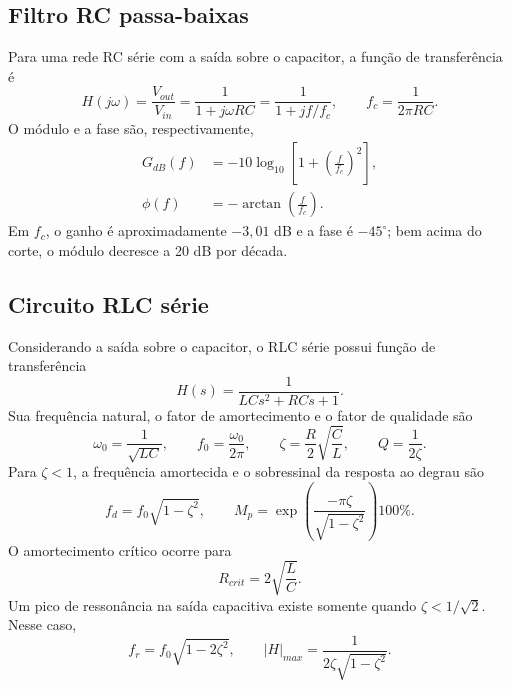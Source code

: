 \documentclass[10pt,journal,onecolumn,a4paper]{IEEEtran}
\begin{document}
\subsection{Filtro RC passa-baixas}

Para uma rede RC série com a saída sobre o capacitor, a função de transferência é
\begin{equation}
  H(j\omega)=\frac{V_{out}}{V_{in}}
             =\frac{1}{1+j\omega RC}
             =\frac{1}{1+jf/f_c},
  \qquad
  f_c=\frac{1}{2\pi RC}.
  \label{eq:rc}
\end{equation}
O módulo e a fase são, respectivamente,
\begin{align}
  G_{dB}(f)&=-10\log_{10}\!\left[1+\left(\frac{f}{f_c}\right)^2\right],
  \label{eq:rc-ganho}\\
  \phi(f)&=-\arctan\!\left(\frac{f}{f_c}\right).
  \label{eq:rc-fase}
\end{align}
Em $f_c$, o ganho é aproximadamente $-3{,}01$ dB e a fase é $-45^\circ$; bem acima do corte,
o módulo decresce a 20 dB por década.

\subsection{Circuito RLC série}

Considerando a saída sobre o capacitor, o RLC série possui função de transferência
\begin{equation}
  H(s)=\frac{1}{LCs^2+RCs+1}.
  \label{eq:rlc-h}
\end{equation}
Sua frequência natural, o fator de amortecimento e o fator de qualidade são
\begin{equation}
  \omega_0=\frac{1}{\sqrt{LC}},
  \qquad
  f_0=\frac{\omega_0}{2\pi},
  \qquad
  \zeta=\frac{R}{2}\sqrt{\frac{C}{L}},
  \qquad
  Q=\frac{1}{2\zeta}.
  \label{eq:rlc-param}
\end{equation}
Para $\zeta<1$, a frequência amortecida e o sobressinal da resposta ao degrau são
\begin{equation}
  f_d=f_0\sqrt{1-\zeta^2},
  \qquad
  M_p=\exp\!\left(\frac{-\pi\zeta}{\sqrt{1-\zeta^2}}\right)100\%.
  \label{eq:rlc-step}
\end{equation}
O amortecimento crítico ocorre para
\begin{equation}
  R_{crit}=2\sqrt{\frac{L}{C}}.
  \label{eq:rcrit}
\end{equation}
Um pico de ressonância na saída capacitiva existe somente quando
$\zeta<1/\sqrt{2}$. Nesse caso,
\begin{equation}
  f_r=f_0\sqrt{1-2\zeta^2},
  \qquad
  |H|_{max}=\frac{1}{2\zeta\sqrt{1-\zeta^2}}.
  \label{eq:ressonancia}
\end{equation}
\end{document}
